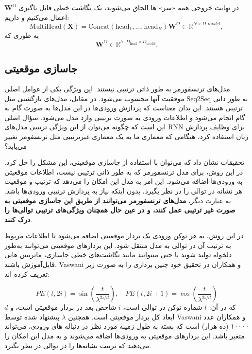 در نهایت خروجی همه «سر» ها الحاق می‌شوند، یک نگاشت خطی قابل یاگیری
$\mathbf{W}^O$
اعمال می‌کنیم و داریم:
$$
\text{MultiHead}(\mathbf{X}) = \text{Concat}(\text{head}_1, \dots, \text{head}_H) \mathbf{W}^O \in \mathbb{R}^{N \times D\_{model}},
$$
به طوری که
$$
\mathbf{W}^O \in \mathbb{R}^{h \cdot D_{\text{head}} \times D_{\text{model}}}.
$$

\subsection{جاسازی موقعیتی}

مدل‌های ترنسفورمر به طور ذاتی ترتیبی نیستند. این ویژگی یکی از عوامل اصلی موفقیت آنها محسوب می‌شود. در مقابل، مدل‌های بازگشتی مثل Seq2Seq به طور ذاتی ترتیبی هستند. این بدان معناست که پردازش ورودی‌ها در این مدل‌ها به صورت گام به گام انجام می‌شود و اطلاعات ورودی به صورت ترتیبی وارد مدل می‌شود. سؤال اصلی این است که چگونه می‌توان از این ویژگی ترتیبی مدل‌های RNN برای وظایف پردازش زبان استفاده کرد، هنگامی که معماری ما به یک معماری غیرترتیبی مثل ترنسفومر تغییر می‌یابد؟

تحقیقات نشان داد که می‌توان با استفاده از جاسازی موقعیتی، این مشکل را حل کرد. در این روش، برای مدل ترنسفورمر که به طور ذاتی ترتیبی نیست، اطلاعات موقعیتی به ورودی‌ها اضافه می‌شود. این امر به مدل این امکان را می‌دهد که ترتیب و موقعیت هر نشانه در توالی را در نظر بگیرد، بدون اینکه نیاز به پردازش ترتیبی ورودی‌ها باشد. به عبارت دیگر، \textbf{مدل‌های ترنسفورمر می‌توانند از طریق این جاسازی موقعیتی به صورت غیر ترتیبی عمل کنند، و در عین حال همچنان ویژگی‌های ترتیبی توالی‌ها را درک کنند}.

در این روش، به هر توکن ورودی یک بردار موقعیتی اضافه می‌شود تا اطلاعات مربوط به ترتیب آن در توالی به مدل منتقل شود. این بردارهای موقعیتی می‌توانند به‌طور دلخواه تولید شوند یا حتی میتوانند مانند نگاشت‌های خطی جاسازی، ماتریس هایی قابل‌آموزش باشند. Vaswani و همکاران در تحقیق خود چنین برداری را  به صورت زیر تعریف کرده اند:

\begin{equation}
PE(t, 2i) = \sin\left( \frac{t}{\lambda^{2i/d}} \right), \quad PE(t, 2i+1) = \cos\left( \frac{t}{\lambda^{2i/d}} \right)
\end{equation}
که در آن:
$t$ شماره توکن در توالی است،
$i$ شاخص بعد در بردار موقعیتی است،
و
$d$ ابعاد کل بردار موقعیتی است. 
همچنین $\lambda$ پیشنهاد شده توسط Vaswani و همکاران عدد ۱۰۰۰۰ (ده هزار) است که بسته به طول زمینه%
مورد نظر در دنباله های ورودی، می‌تواند متغیر باشد. این بردارهای موقعیتی به ورودی‌ها اضافه می‌شوند و به مدل این امکان را می‌دهند که ترتیب نشانه‌ها را در توالی در نظر بگیرد.

